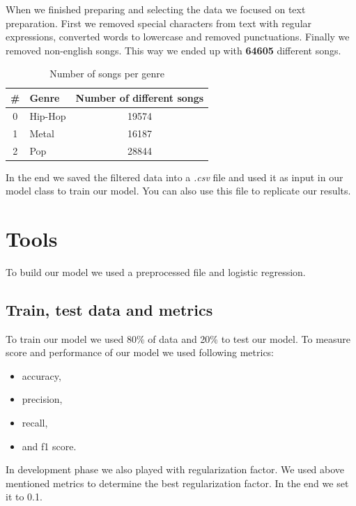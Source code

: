 \documentclass[a4paper,11pt]{article}
\begin{document}
When we finished preparing and selecting the data we focused on text preparation. First we removed special characters from text with regular expressions, converted words to lowercase and removed punctuations. Finally we removed non-english songs. This way we ended up with \textbf{64605} different songs.

\begin{table}[h!]
\centering
\label{baseline}
\begin{tabular}{|clc|}
\hline
\# & Genre & Number of different songs \\
\hline
0 & Hip-Hop & 19574 \\
1 & Metal & 16187 \\
2 & Pop & 28844 \\
\hline
\end{tabular}
\caption{Number of songs per genre}
\end{table}

In the end we saved the filtered data into a \textit{.csv} file and used it as input in our model class to train our model. You can also use this file to replicate our results.

\section{Tools}

To build our model we used a preprocessed file and logistic regression.

\subsection{Train, test data and metrics}
To train our model we used 80\% of data and 20\% to test our model. To measure score and performance of our model we used following metrics:
\begin{itemize}
\item accuracy,
\item precision,
\item recall,
\item and f1 score.
\end{itemize}

In development phase we also played with regularization factor. We used above mentioned metrics to determine the best regularization factor. In the end we set it to 0.1.
\end{document}
